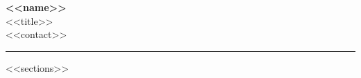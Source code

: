 \documentclass[11pt,letterpaper]{article}
\begin{document}
\begin{center}
    {\Large \textbf{\color{primary} <<name>>}} \\
    \vspace{0.15em}
    {\small <<title>>} \\
    \vspace{0.3em}
    {\small \color{secondary} <<contact>>}
\end{center}

\vspace{0.4em}
\hrule
\vspace{0.4em}

<<sections>>
\end{document}
